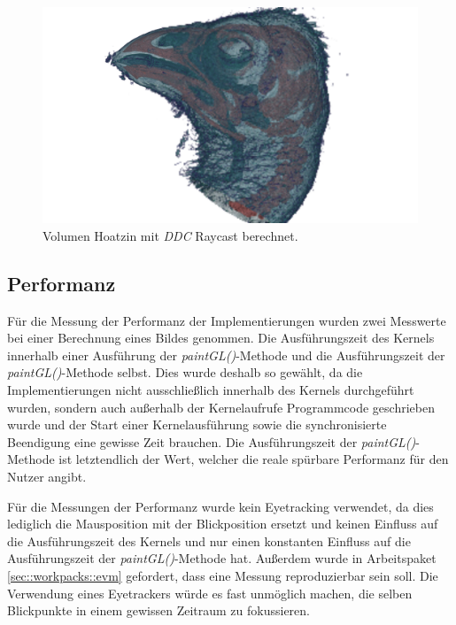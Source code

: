 \begin{landscape}
	\begin{figure}
		\centering
		\includegraphics[width=1\textheight]{../../Grafiken/results/picture_quality/hoatzin/DDC_img-1_ray-1-5.png}
		\caption{Volumen Hoatzin mit \emph{DDC} Raycast berechnet.}
		\label{fig::res::hoa_ddc}
	\end{figure}
\end{landscape}
\fi

\subsection{Performanz}
Für die Messung der Performanz der Implementierungen wurden zwei Messwerte bei einer Berechnung eines Bildes genommen.
Die Ausführungszeit des Kernels innerhalb einer Ausführung der \emph{paintGL()}-Methode und die Ausführungszeit der \emph{paintGL()}-Methode selbst.
Dies wurde deshalb so gewählt, da die Implementierungen nicht ausschließlich innerhalb des Kernels durchgeführt wurden, sondern auch außerhalb der Kernelaufrufe Programmcode geschrieben wurde und der Start einer Kernelausführung sowie die synchronisierte Beendigung eine gewisse Zeit brauchen.
Die Ausführungszeit der \emph{paintGL()}-Methode ist letztendlich der Wert, welcher die reale spürbare Performanz für den Nutzer angibt.

Für die Messungen der Performanz wurde kein Eyetracking verwendet, da dies lediglich die Mausposition mit der Blickposition ersetzt und keinen Einfluss auf die Ausführungszeit des Kernels und nur einen konstanten Einfluss auf die Ausführungszeit der \emph{paintGL()}-Methode hat.
Außerdem wurde in Arbeitspaket \ref{sec::workpacks::evm} gefordert, dass eine Messung reproduzierbar sein soll.
Die Verwendung eines Eyetrackers würde es fast unmöglich machen, die selben Blickpunkte in einem gewissen Zeitraum zu fokussieren.

